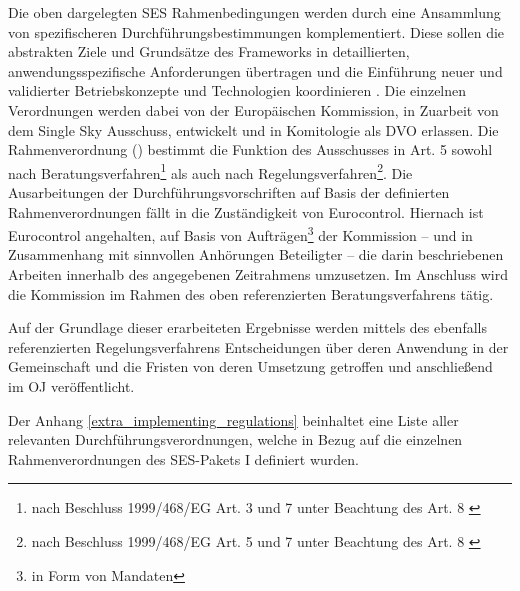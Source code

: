     Die oben dargelegten \ac{SES} Rahmenbedingungen werden durch eine Ansammlung von spezifischeren Durchführungsbestimmungen komplementiert.
    Diese sollen die abstrakten Ziele und Grundsätze des Frameworks in detaillierten, anwendungsspezifische Anforderungen übertragen und die Einführung neuer und validierter Betriebskonzepte und Technologien koordinieren \cite[22]{baf_iop}.
    Die einzelnen  Verordnungen werden dabei von der Europäischen Kommission, in Zuarbeit von dem Single Sky Ausschuss, entwickelt und in Komitologie als \acf{DVO} erlassen.
    Die Rahmenverordnung () bestimmt die Funktion des Ausschusses in Art. 5 sowohl nach Beratungsverfahren\footnote{nach Beschluss 1999/468/EG Art. 3 und 7 unter Beachtung des Art. 8 \cite{31999D0468}} als auch nach Regelungsverfahren\footnote{nach Beschluss 1999/468/EG Art. 5 und 7 unter Beachtung des Art. 8 \cite{31999D0468}}.
    Die Ausarbeitungen der Durchführungsvorschriften auf Basis der definierten Rahmenverordnungen \cite[Art. 3]{2004R0549} fällt in die Zuständigkeit von Eurocontrol. 
    Hiernach ist Eurocontrol angehalten, auf Basis von Aufträgen\footnote{in Form von Mandaten} der Kommission -- und in Zusammenhang mit sinnvollen Anhörungen Beteiligter -- die darin beschriebenen Arbeiten innerhalb des angegebenen Zeitrahmens umzusetzen. 
    Im Anschluss wird die Kommission im Rahmen des oben referenzierten Beratungsverfahrens tätig.
    \cite[Art. 8. Abs. 1]{2004R0549}

    \medskip
    Auf der Grundlage dieser erarbeiteten Ergebnisse werden mittels des ebenfalls referenzierten Regelungsverfahrens Entscheidungen über deren Anwendung in der Gemeinschaft und die Fristen von deren Umsetzung getroffen und anschließend im \ac{OJ} veröffentlicht.
    \cite[Art. 8 Abs. 2]{2004R0549}
    
    \bigskip\noindent
    Der Anhang \ref{extra_implementing_regulations} beinhaltet eine Liste aller relevanten Durchführungsverordnungen, welche in Bezug auf die einzelnen Rahmenverordnungen des \ac{SES}-Pakets I definiert wurden.
